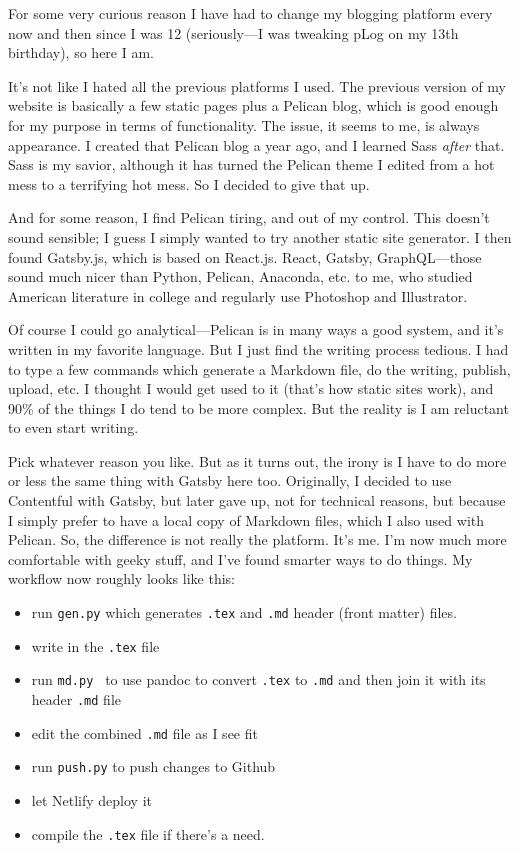 For some very curious reason I have had to change my blogging platform every now and then since I was 12 (seriously---I was tweaking pLog on my 13th birthday), so here I am. 

It's not like I hated all the previous platforms I used. The previous version of my website is basically a few static pages plus a Pelican blog, which is good enough for my purpose in terms of functionality. The issue, it seems to me, is always appearance. I created that Pelican blog a year ago, and I learned Sass \textit{after} that. Sass is my savior, although it has turned the Pelican theme I edited from a hot mess to a terrifying hot mess. So I decided to give that up.

And for some reason, I find Pelican tiring, and out of my control. This doesn't sound sensible; I guess I simply wanted to try another static site generator. I then found Gatsby.js, which is based on React.js. React, Gatsby, GraphQL---those sound much nicer than Python, Pelican, Anaconda, etc. to me, who studied American literature in college and regularly use Photoshop and Illustrator.

Of course I could go analytical---Pelican is in many ways a good system, and it's written in my favorite language. But I just find the writing process tedious. I had to type a few commands which generate a Markdown file, do the writing, publish, upload, etc. I thought I would get used to it (that's how static sites work), and 90\% of the things I do tend to be more complex. But the reality is I am reluctant to even start writing.

Pick whatever reason you like. But as it turns out, the irony is I have to do more or less the same thing with Gatsby here too. Originally, I decided to use Contentful with Gatsby, but later gave up, not for technical reasons, but because I simply prefer to have a local copy of Markdown files, which I also used with Pelican. So, the difference is not really the platform. It's me. I'm now much more comfortable with geeky stuff, and I've found smarter ways to do things. My workflow now roughly looks like this:

\begin{itemize}
	\item run \texttt{gen.py} which generates \texttt{.tex} and \texttt{.md} header (front matter) files.
	\item write in the \texttt{.tex} file
	\item run \texttt{md.py } to use pandoc to convert \texttt{.tex} to \texttt{.md} and then join it with its header \texttt{.md} file
	\item edit the combined \texttt{.md} file as I see fit
	\item run \texttt{push.py} to push changes to Github
	\item let Netlify deploy it
	\item compile the \texttt{.tex} file if there's a need.
\end{itemize}

